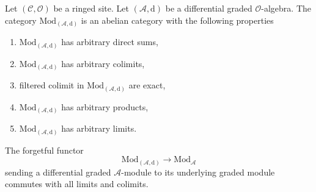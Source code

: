 \begin{lemma}
\label{lemma-dgm-abelian}
Let $(\mathcal{C}, \mathcal{O})$ be a ringed site.
Let $(\mathcal{A}, \text{d})$ be a differential graded $\mathcal{O}$-algebra.
The category $\text{Mod}_{(\mathcal{A}, \text{d})}$ is an abelian category
with the following properties
\begin{enumerate}
\item $\text{Mod}_{(\mathcal{A}, \text{d})}$ has arbitrary direct sums,
\item $\text{Mod}_{(\mathcal{A}, \text{d})}$ has arbitrary colimits,
\item filtered colimit in $\text{Mod}_{(\mathcal{A}, \text{d})}$ are exact,
\item $\text{Mod}_{(\mathcal{A}, \text{d})}$ has arbitrary products,
\item $\text{Mod}_{(\mathcal{A}, \text{d})}$ has arbitrary limits.
\end{enumerate}
The forgetful functor
$$
\text{Mod}_{(\mathcal{A}, \text{d})}
\longrightarrow
\text{Mod}_\mathcal{A}
$$
sending a differential graded $\mathcal{A}$-module to its underlying
graded module commutes with all limits and colimits.
\end{lemma}

